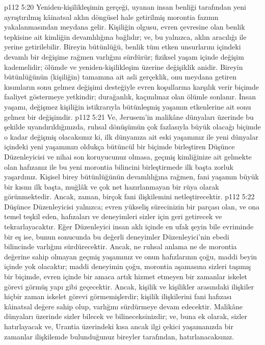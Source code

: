 \vs p112 5:20 Yeniden\hyp{}kişilikleşimin gerçeği, uyanan insan benliği tarafından yeni ayrıştırılmış kâinatsal aklın döngüsel hale getirilmiş morontia fazının yakalanmasından meydana gelir. Kişiliğin olgusu, evren çevresine olan benlik tepkisine ait kimliğin devamlılığına bağlıdır; ve, bu yalnızca, aklın aracılığı ile yerine getirilebilir. Bireyin bütünlüğü, benlik tüm etken unsurlarını içindeki devamlı bir değişime rağmen varlığını sürdürür; fiziksel yaşam içinde değişim kademelidir; ölümde ve yeniden\hyp{}kişilikleşim üzerine değişiklik anidir. Bireyin bütünlüğünün (kişiliğin) tamamına ait asli gerçeklik, onu meydana getiren kısımların sonu gelmez değişimi desteğiyle evren koşullarına karşılık verir biçimde faaliyet göstermeye yetkindir; durağanlık, kaçınılmaz olan ölümle sonlanır. İnsan yaşamı, değişmez kişiliğin istikrarıyla bütünleşmiş yaşamın etkenlerine ait sonu gelmez bir değişimdir.
\vs p112 5:21 Ve, Jerusem’in malikâne dünyaları üzerinde bu şekilde uyandırıldığınızda, ruhsal dönüşümün çok fazlasıyla büyük olacağı biçimde o kadar değişmiş olacaksınız ki, ilk dünyanıza ait eski yaşamınız ile yeni dünyalar içindeki yeni yaşamınızı oldukça bütüncül bir biçimde birleştiren Düşünce Düzenleyicisi ve nihai son koruyucunuz olmasa, geçmiş kimliğinize ait gelmekte olan hafızanız ile bu yeni morontia bilincini birleştirmede ilk başta zorluk yaşardınız. Kişisel birey bütünlüğünün devamlılığına rağmen, fani yaşamın büyük bir kısmı ilk başta, muğlâk ve çok net hazırlanmayan bir rüya olarak görünmektedir. Ancak, zaman, birçok fani ilişkilemini netleştirecektir.
\vs p112 5:22 Düşünce Düzenleyicisi yalnızca; evren yükseliş sürecinizin bir parçası olan, ve ona temel teşkil eden, hafızaları ve deneyimleri sizler için geri getirecek ve tekrarlayacaktır. Eğer Düzenleyici insan aklı içinde en ufak şeyin bile evriminde bir eş ise, bunun sonucunda bu değerli deneyimler Düzenleyici’nin ebedi bilincinde varlığını sürdürecektir. Ancak, ne ruhsal anlama ne de morontia değerine sahip olmayan geçmiş yaşamınız ve onun hafızlarının çoğu, maddi beyin içinde yok olacaktır; maddi deneyimin çoğu, morontia aşamasına sizleri taşımış bir biçimde, evren içinde bir amaca artık hizmet etmeyen bir zamanlar iskelet görevi görmüş yapı gibi geçecektir. Ancak, kişilik ve kişilikler arasındaki ilişkiler hiçbir zaman iskelet görevi görmemişlerdir; kişilik ilişkilerini fani hafızası kâinatsal değere sahip olup, varlığını sürdürmeye devam edecektir. Malikâne dünyaları üzerinde sizler bilecek ve bilineceksinizdir; ve, buna ek olarak, sizler hatırlayacak ve, Urantia üzerindeki kısa ancak ilgi çekici yaşamanızda bir zamanlar ilişkilemde bulunduğunuz bireyler tarafından, hatırlanacaksınız.
